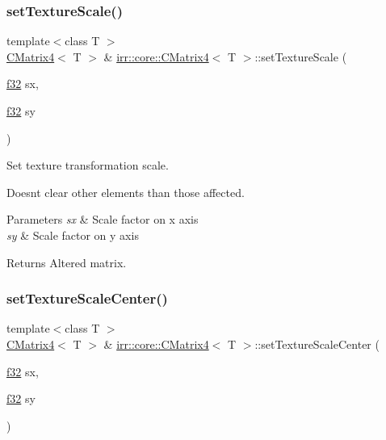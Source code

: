 \subsubsection{\texorpdfstring{set\+Texture\+Scale()}{setTextureScale()}}
{\footnotesize\ttfamily template$<$class T $>$ \\
\hyperlink{classirr_1_1core_1_1CMatrix4}{C\+Matrix4}$<$ T $>$ \& \hyperlink{classirr_1_1core_1_1CMatrix4}{irr\+::core\+::\+C\+Matrix4}$<$ T $>$\+::set\+Texture\+Scale (\begin{DoxyParamCaption}\item[{\hyperlink{namespaceirr_a0277be98d67dc26ff93b1a6a1d086b07}{f32}}]{sx,  }\item[{\hyperlink{namespaceirr_a0277be98d67dc26ff93b1a6a1d086b07}{f32}}]{sy }\end{DoxyParamCaption})\hspace{0.3cm}{\ttfamily [inline]}}



Set texture transformation scale. 

Doesn\textquotesingle{}t clear other elements than those affected. 
\begin{DoxyParams}{Parameters}
{\em sx} & Scale factor on x axis \\
\hline
{\em sy} & Scale factor on y axis \\
\hline
\end{DoxyParams}
\begin{DoxyReturn}{Returns}
Altered matrix. 
\end{DoxyReturn}
\mbox{\label{classirr_1_1core_1_1CMatrix4_adbd668867d117dc9331e68abef0af221}} 
\subsubsection{\texorpdfstring{set\+Texture\+Scale\+Center()}{setTextureScaleCenter()}}
{\footnotesize\ttfamily template$<$class T $>$ \\
\hyperlink{classirr_1_1core_1_1CMatrix4}{C\+Matrix4}$<$ T $>$ \& \hyperlink{classirr_1_1core_1_1CMatrix4}{irr\+::core\+::\+C\+Matrix4}$<$ T $>$\+::set\+Texture\+Scale\+Center (\begin{DoxyParamCaption}\item[{\hyperlink{namespaceirr_a0277be98d67dc26ff93b1a6a1d086b07}{f32}}]{sx,  }\item[{\hyperlink{namespaceirr_a0277be98d67dc26ff93b1a6a1d086b07}{f32}}]{sy }\end{DoxyParamCaption})\hspace{0.3cm}{\ttfamily [inline]}}



